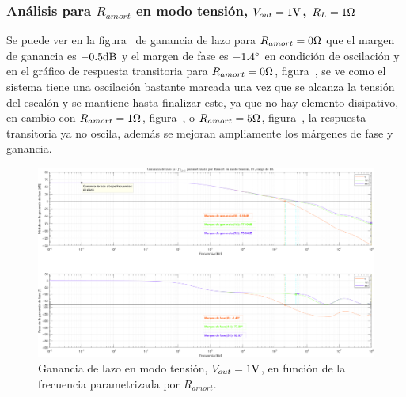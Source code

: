 \clearpage


\subsubsection{Análisis para $R_{amort}$ en modo tensión, $V_{out} = 1 \si[per-mode=symbol]{\volt}$, $R_{L} = 1 \si[per-mode=symbol]{\ohm}$}

Se puede ver en la figura~ de ganancia de lazo para $R_{amort} = 0 \si[per-mode=symbol]{\ohm} $ que el margen de ganancia es $-0.5 \si[per-mode=symbol]{\decibel} $ y el margen de fase es $-1.4 \si[per-mode=symbol]{\degree} $ en condición de oscilación y en el gráfico de respuesta transitoria para $R_{amort} = 0 \si[per-mode=symbol]{\ohm} $, figura~, se ve como el sistema tiene una oscilación bastante marcada una vez que se alcanza la tensión del escalón y se mantiene hasta finalizar este, ya que no hay elemento disipativo, en cambio con $R_{amort} = 1 \si[per-mode=symbol]{\ohm} $, figura~, o $R_{amort} = 5 \si[per-mode=symbol]{\ohm} $, figura~, la respuesta transitoria ya no oscila, además se mejoran ampliamente los márgenes de fase y ganancia.

\vfill



\clearpage

\begin{figure}[H] %
\begin{center}
\includegraphics[width=1.1 \textwidth, angle=90]{./img/plots/loop/power_supply_RAMORT_LOOP_Modo2.png}
\caption{\label{fig:fig_power_supply_RAMORT_LOOP_Modo2}\footnotesize{Ganancia de lazo en modo tensión, $V_{out} = 1 \si[per-mode=symbol]{\volt}$, en función de la frecuencia parametrizada por $R_{amort}$.}}
\end{center}
\end{figure}


